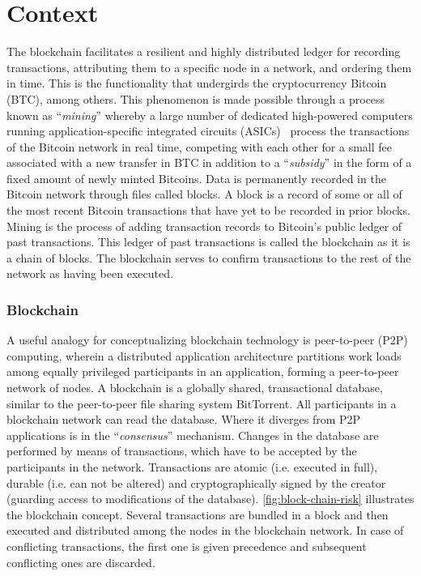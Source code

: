 \section{Context}

The blockchain facilitates a resilient and highly distributed ledger for recording transactions, attributing them to a specific node in a network, and ordering them in time. 
This is the functionality that undergirds the cryptocurrency Bitcoin (BTC), among others. This phenomenon is made possible through a process known as ``\textit{mining}'' whereby a large number of dedicated high-powered computers running application-specific integrated circuits (ASICs)~\cite{grantbrunner2013} process the transactions of the Bitcoin network in real time, competing with each other for a small fee associated with a new transfer in BTC in addition to a ``\textit{subsidy}'' in the form of a fixed amount of newly minted Bitcoins.
Data is permanently recorded in the Bitcoin network through files called blocks. 
A block is a record of some or all of the most recent Bitcoin transactions that have yet to be recorded in prior blocks. 
Mining is the process of adding transaction records to Bitcoin's public ledger of past transactions. 
This ledger of past transactions is called the blockchain as it is a chain of blocks. 
The blockchain serves to confirm transactions to the rest of the network as having been executed.

\subsubsection{Blockchain}

A useful analogy for conceptualizing blockchain technology is peer-to-peer (P2P) computing, wherein a distributed application architecture partitions work loads among equally privileged participants in an application, forming a peer-to-peer network of nodes.
A blockchain is a globally shared, transactional database, similar to the peer-to-peer file sharing system BitTorrent. 
All participants in a blockchain network can read the database. 
Where it diverges from P2P applications is in the ``\textit{consensus}'' mechanism. 
Changes in the database are performed by means of transactions, which have to be accepted by the participants in the network. 
Transactions are atomic (i.e. executed in full), durable (i.e. can not be altered) and cryptographically signed by the creator (guarding access to modifications of the database). 
\autoref{fig:block-chain-risk} illustrates the blockchain concept. 
Several transactions are bundled in a block and then executed and distributed among the nodes in the blockchain network. 
In case of conflicting transactions, the first one is given precedence and subsequent conflicting ones are discarded.

